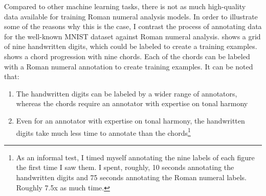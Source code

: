 

Compared to other machine learning tasks, there is not as
much high-quality data available for training Roman numeral
analysis models. In order to illustrate some of the reasons
why this is the case, I contrast the process of annotating
data for the well-known MNIST dataset
\cite{lecun1989handwritten} against Roman numeral analysis.
 shows a grid of nine handwritten digits,
which could be labeled to create a training examples.
 shows a chord progression with nine chords.
Each of the chords can be labeled with a Roman numeral
annotation to create training examples. It can be noted
that:

\begin{enumerate}
    \item The handwritten digits can be labeled by a wider
    range of annotators, whereas the chords require an annotator with expertise on tonal harmony
    \item Even for an annotator with expertise on tonal harmony, the handwritten digits take much less time to annotate than the chords\footnote{As an informal test, I timed myself annotating the nine labels of each figure the first time I saw them. I spent, roughly, 10 seconds annotating the handwritten digits and 75 seconds annotating the Roman numeral labels. Roughly 7.5x as much time.}
\end{enumerate}


